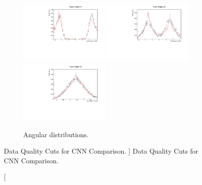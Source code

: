 \begin{figure}
	\begin{subfigure}[b]{\textwidth}
		\centering
		\includegraphics[width=0.49\textwidth]{figures/angXY_cuts.pdf}
		\hfill
		\includegraphics[width=0.49\textwidth]{figures/angXZ_cuts.pdf}
		\includegraphics[width=0.49\textwidth]{figures/angYZ_cuts.pdf}
		\caption {Angular distributions.}
		\label{fig:angular_dist}
	\end{subfigure}

	\caption 
	[ Data Quality Cuts for CNN Comparison. ]
	{Data Quality Cuts for CNN Comparison.}
	\label{fig:cnn_cuts_spatial}

\end{figure}

